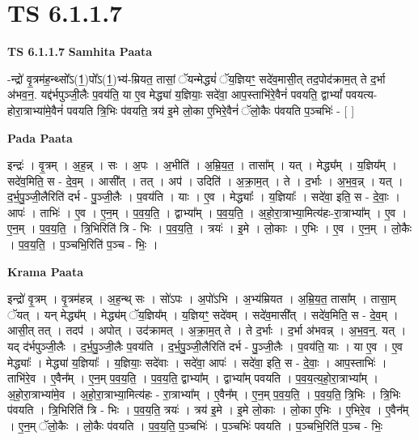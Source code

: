 \documentclass[17pt]{extarticle}
\begin{document}
\section{ TS 6.1.1.7 }

\textbf{TS 6.1.1.7 } \newline
\textbf{Samhita Paata} \newline

-न्द्रो॑ वृ॒त्रम॑ह॒न्थ्सो᳚ऽ(1॒)पो᳚ऽ(1॒)भ्य॑-म्रियत॒ तासां॒ ॅयन्मेद्ध्यं॑ ॅय॒ज्ञियꣳ॒॒ सदे॑व॒मासी॒त् तद॒पोद॑क्राम॒त् ते द॒र्भा अ॑भव॒न॒. यद्द॑र्भपुञ्जी॒लैः प॒वय॑ति॒ या ए॒व मेद्ध्या॑ य॒ज्ञियाः॒ सदे॑वा॒ आप॒स्ताभि॑रे॒वैनं॑ पवयति॒ द्वाभ्यां᳚ पवयत्य-होरा॒त्राभ्या॑मे॒वैनं॑ पवयति त्रि॒भिः प॑वयति॒ त्रय॑ इ॒मे लो॒का ए॒भिरे॒वैनं॑ ॅलो॒कैः प॑वयति प॒ञ्चभिः॑ - [  ] \newline

\textbf{Pada Paata} \newline

इन्द्रः॑ । वृ॒त्रम् । अ॒ह॒न्न् । सः । अ॒पः । अ॒भीति॑ । अ॒म्रि॒य॒त॒ । तासा᳚म् । यत् । मेद्ध्य᳚म् । य॒ज्ञिय᳚म् । सदे॑व॒मिति॒ स - दे॒व॒म् । आसी᳚त् । तत् । अप॑ । उदिति॑ । अ॒क्रा॒म॒त् । ते । द॒र्भाः । अ॒भ॒व॒न्न् । यत् । द॒र्भ॒पु॒ञ्जी॒लैरिति॑ दर्भ - पु॒ञ्जी॒लैः । प॒वय॑ति । याः । ए॒व । मेद्ध्याः᳚ । य॒ज्ञियाः᳚ । सदे॑वा॒ इति॒ स - दे॒वाः॒ । आपः॑ । ताभिः॑ । ए॒व । ए॒न॒म् । प॒व॒य॒ति॒ । द्वाभ्या᳚म् । प॒व॒य॒ति॒ । अ॒हो॒रा॒त्राभ्या॒मित्य॑हः-रा॒त्राभ्या᳚म् । ए॒व । ए॒न॒म् । प॒व॒य॒ति॒ । त्रि॒भिरिति॑ त्रि - भिः । प॒व॒य॒ति॒ । त्रयः॑ । इ॒मे । लो॒काः । ए॒भिः । ए॒व । ए॒न॒म् । लो॒कैः । प॒व॒य॒ति॒ । प॒ञ्चभि॒रिति॑ प॒ञ्च - भिः॒ ।  \newline


\textbf{Krama Paata} \newline

इन्द्रो॑ वृ॒त्रम् । वृ॒त्रम॑हन्न् । अ॒ह॒न्थ् सः । सो॑ऽपः । अ॒पो॑ऽभि । अ॒भ्य॑म्रियत । अ॒म्रि॒य॒त॒ तासा᳚म् । तासा॒म् ॅयत् । यन् मेद्ध्य᳚म् । मेद्ध्य॑म् ॅय॒ज्ञिय᳚म् । य॒ज्ञियꣳ॒॒ सदे॑वम् । सदे॑व॒मासी᳚त् । सदे॑व॒मिति॒ स - दे॒व॒म् । आसी॒त् तत् । तदप॑ । अपोत् । उद॑क्रामत् । अ॒क्रा॒म॒त् ते । ते द॒र्भाः । द॒र्भा अ॑भवन्न् । अ॒भ॒व॒न्॒. यत् । यद् द॑र्भपुञ्जी॒लैः । द॒र्भ॒पु॒ञ्जी॒लैः प॒वय॑ति । द॒र्भ॒पु॒ञ्जी॒लैरिति॑ दर्भ - पु॒ञ्जी॒लैः । प॒वय॑ति॒ याः । या ए॒व । ए॒व मेद्ध्याः᳚ । मेद्ध्या॑ य॒ज्ञियाः᳚ । य॒ज्ञियाः॒ सदे॑वाः । सदे॑वा॒ आपः॑ । सदे॑वा॒ इति॒ स - दे॒वाः॒ । आप॒स्ताभिः॑ । ताभि॑रे॒व । ए॒वैन᳚म् । ए॒न॒म् प॒व॒य॒ति॒ । प॒व॒य॒ति॒ द्वाभ्या᳚म् । द्वाभ्या᳚म् पवयति । प॒व॒य॒त्य॒हो॒रा॒त्राभ्या᳚म् । अ॒हो॒रा॒त्राभ्या॑मे॒व । अ॒हो॒रा॒त्राभ्या॒मित्य॑हः - रा॒त्राभ्या᳚म् । ए॒वैन᳚म् । ए॒न॒म् प॒व॒य॒ति॒ । प॒व॒य॒ति॒ त्रि॒भिः । त्रि॒भिः प॑वयति । त्रि॒भिरिति॑ त्रि - भिः । प॒व॒य॒ति॒ त्रयः॑ । त्रय॑ इ॒मे । इ॒मे लो॒काः । लो॒का ए॒भिः । ए॒भिरे॒व । ए॒वैन᳚म् । ए॒न॒म् ॅलो॒कैः । लो॒कैः प॑वयति । प॒व॒य॒ति॒ प॒ञ्चभिः॑ । प॒ञ्चभिः॑ पवयति । प॒ञ्चभि॒रिति॑ प॒ञ्च - भिः॒ \newline
\end{document}
